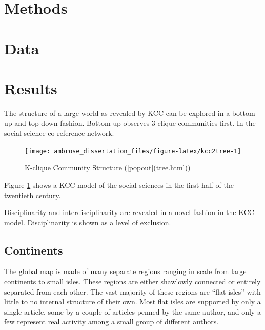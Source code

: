 \documentclass[]{book}
\theoremstyle{definition}
\theoremstyle{definition}
\theoremstyle{definition}
\theoremstyle{remark}
\begin{document}
\hypertarget{methods}{%
\section{Methods}\label{methods}}

\hypertarget{data-1}{%
\section{Data}\label{data-1}}

\hypertarget{results}{%
\section{Results}\label{results}}

The structure of a large world as revealed by KCC can be explored in a
bottom-up and top-down fashion. Bottom-up observes 3-clique communities
first. In the social science co-reference network.

\begin{figure}

{\centering \texttt{[image: ambrose\_dissertation\_files/figure-latex/kcc2tree-1]} 

}

\caption{K-clique Community Structure ([popout](tree.html))}\label{fig:kcc2tree}
\end{figure}

Figure \ref{fig:kcc2tree} shows a KCC model of the social sciences in
the first half of the twentieth century.

Disciplinarity and interdisciplinarity are revealed in a novel fashion
in the KCC model. Disciplinarity is shown as a level of exclusion.

\hypertarget{continents}{%
\subsection{Continents}\label{continents}}

The global map is made of many separate regions ranging in scale from
large continents to small isles. These regions are either shawlowly
connected or entirely separated from each other. The vast majority of
these regions are ``flat isles'' with little to no internal structure of
their own. Most flat isles are supported by only a single article, some
by a couple of articles penned by the same author, and only a few
represent real activity among a small group of different authors.
\end{document}
